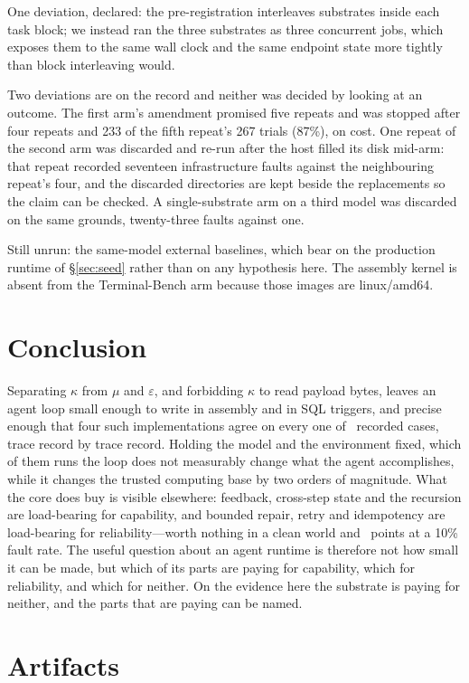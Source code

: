 \documentclass[11pt,a4paper]{article}
\begin{document}
One deviation, declared: the pre-registration interleaves substrates inside
each task block; we instead ran the three substrates as three concurrent jobs,
which exposes them to the same wall clock and the same endpoint state more
tightly than block interleaving would.

Two deviations are on the record and neither was decided by looking at an
outcome. The first arm's amendment promised five repeats and was stopped after
four repeats and 233 of the fifth repeat's 267 trials (87\%), on cost. One repeat of the second arm was discarded
and re-run after the host filled its disk mid-arm: that repeat recorded
seventeen infrastructure faults against the neighbouring repeat's four, and the
discarded directories are kept beside the replacements so the claim can be
checked. A single-substrate arm on a third model was discarded on the same
grounds, twenty-three faults against one.

Still unrun: the same-model external baselines, which bear on the production
runtime of \S\ref{sec:seed} rather than on any hypothesis here. The assembly
kernel is absent from the Terminal-Bench arm because those images are
linux/amd64.

\section{Conclusion}

Separating $\kappa$ from $\mu$ and $\varepsilon$, and forbidding $\kappa$ to
read payload bytes, leaves an agent loop small enough to write in assembly and
in SQL triggers, and precise enough that four such implementations agree on
every one of \confcases\ recorded cases, trace record by trace record. Holding
the model and the environment fixed, which of them runs the loop does not
measurably change what the agent accomplishes, while it changes the trusted
computing base by two orders of magnitude. What the core does buy is visible
elsewhere: feedback, cross-step state and the recursion are load-bearing for
capability, and bounded repair, retry and idempotency are load-bearing for
reliability---worth nothing in a clean world and \recoverygain\ points at a
10\% fault rate. The useful question about an agent runtime is therefore not how small it can be
made, but which of its parts are paying for capability, which for reliability,
and which for neither. On the evidence here the substrate is paying for
neither, and the parts that are paying can be named.

\section*{Artifacts}
\end{document}
